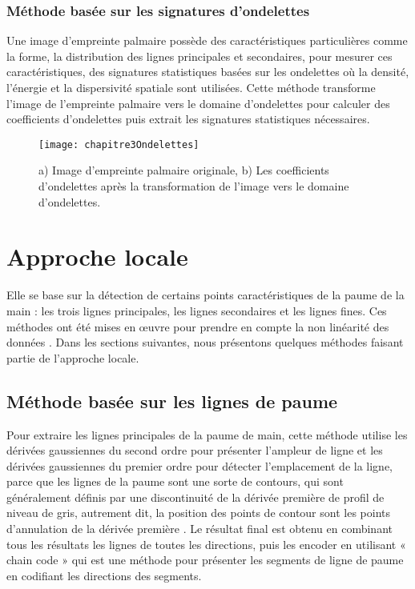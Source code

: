 \subsubsection{Méthode basée sur les signatures d’ondelettes }
Une image d’empreinte palmaire possède des caractéristiques particulières comme la forme, la distribution des lignes principales et secondaires, pour mesurer ces caractéristiques, des signatures statistiques basées sur les ondelettes où la densité, l’énergie et la dispersivité spatiale sont utilisées.
Cette méthode transforme l’image de l’empreinte palmaire vers le domaine d’ondelettes pour calculer des coefficients d’ondelettes puis extrait les signatures statistiques nécessaires.
\begin{center}
	\begin{figure}[H]
		\centering
		\texttt{[image: chapitre3Ondelettes]}
		\caption{a) Image d’empreinte palmaire originale, b) Les coefficients d’ondelettes après la transformation de l’image vers le domaine d’ondelettes.}
		\label{fig:chapitre3Ondelettes}
	\end{figure}
\end{center}
\section{Approche locale }
Elle se base sur la détection de certains points caractéristiques de la paume de la main : les trois lignes principales, les lignes secondaires et les lignes fines. Ces méthodes ont été mises en œuvre pour prendre en compte la non linéarité des données \citep{zhang2012comparative}. Dans les sections suivantes, nous présentons quelques méthodes faisant partie de l’approche locale.
\subsection{Méthode basée sur les lignes de paume}
Pour extraire les lignes principales de la paume de main, cette méthode utilise les dérivées gaussiennes du second ordre pour présenter l’ampleur de ligne et les dérivées gaussiennes du premier ordre pour détecter l’emplacement de la ligne, parce que les lignes de la paume sont une sorte de contours, qui sont généralement définis par une discontinuité de la dérivée première de profil de niveau de gris, autrement dit, la position des points de contour sont les points d’annulation de la dérivée première \citep{wu2006palm}.
Le résultat final est obtenu en combinant tous les résultats les lignes de toutes les directions, puis les encoder en utilisant « chain code » qui est une méthode pour présenter les segments de ligne de paume en codifiant les directions des segments. 

